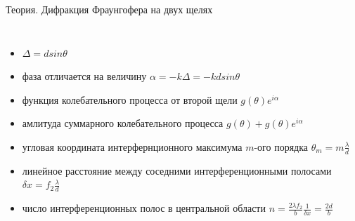 \documentclass[11pt]{beamer} %
\begin{document}
\begin{frame}{Теория. Дифракция Фраунгофера на двух щелях}
\begin{columns}
                \begin{itemize}
                    \item $\Delta =dsin\theta$
                    \item фаза отличается на величину $\alpha = -k\Delta = -kdsin\theta$
                    \item функция колебательного процесса от второй щели $g(\theta)e^{i\alpha}$
                    \item амлитуда суммарного колебательного процесса $g(\theta) + g(\theta)e^{i\alpha}$
                    \item угловая координата интерфернционного максимума $m$-ого порядка $\theta_m = m\frac{\lambda}{d}$
                    \item линейное расстояние между соседними интерференционными полосами $\delta x = f_2\frac{\lambda}{d}$
                    \item число интерференционных полос в центральной области $n = \frac{2\lambda f_2}{b} \frac{1}{\delta x} = \frac{2d}{b}$
                \end{itemize}
        \end{columns}
    \end{frame}
\end{document}
